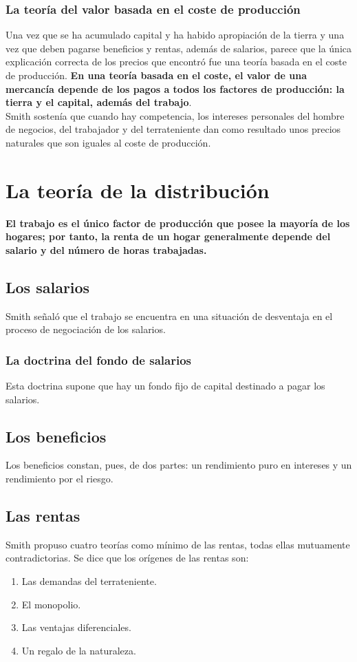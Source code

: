 \documentclass[10pt]{book}
\begin{document}
\subsubsection*{La teoría del valor basada en el coste de producción}
Una vez que se ha acumulado capital y ha habido apropiación de la tierra y una vez que deben pagarse beneficios y rentas, además de salarios, parece que la única explicación correcta de los precios que encontró fue una teoría basada en el coste de producción. \textbf{En una teoría basada en el coste, el valor de una mercancía depende de los pagos a todos los factores de producción: la tierra y el capital, además del trabajo}.\\
Smith sostenía que cuando hay competencia, los intereses personales del hombre de negocios, del trabajador y del terrateniente dan como resultado unos precios naturales que son iguales al coste de producción.

\section{La teoría de la distribución}
\textbf{El trabajo es el único factor de producción que posee la mayoría de los hogares; por tanto, la renta de un hogar generalmente depende del salario y del número de horas trabajadas.}\\

\subsection*{Los salarios}
Smith señaló que el trabajo se encuentra en una situación de desventaja en el proceso de negociación de los salarios.

\subsubsection*{La doctrina del fondo de salarios}
Esta
doctrina supone que hay un fondo fijo de capital destinado a pagar los salarios.

\subsection*{Los beneficios}
Los beneficios constan, pues, de dos partes: un rendimiento puro en intereses y un rendimiento por el riesgo. 

\subsection*{Las rentas}
Smith propuso cuatro teorías como mínimo de las rentas, todas ellas mutuamente contradictorias. Se dice que los orígenes de las rentas son:
\begin{enumerate}[\bfseries (1)]
    \item Las demandas del terrateniente.
    \item El monopolio.
    \item Las ventajas diferenciales.
    \item Un regalo de la naturaleza.
\end{enumerate}
\end{document}
